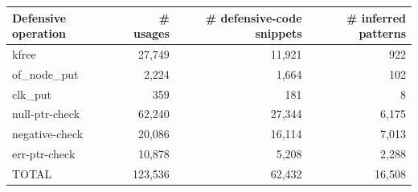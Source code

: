 \begin{tabular}{lrrr}
\toprule
Defensive operation & \# usages & \# defensive-code snippets & \# inferred patterns \\
\midrule
kfree & 27,749 & 11,921 & 922 \\
of\_node\_put & 2,224 & 1,664 & 102 \\
clk\_put & 359 & 181 & 8 \\
null-ptr-check & 62,240 & 27,344 & 6,175 \\
negative-check & 20,086 & 16,114 & 7,013 \\
err-ptr-check & 10,878 & 5,208 & 2,288 \\
TOTAL & 123,536 & 62,432 & 16,508 \\
\bottomrule
\end{tabular}
